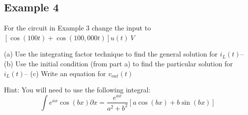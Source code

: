 \documentclass{handout}
\theoremstyle{definition}
\begin{document}
\newpage
\clearpage
\pagebreak

\subsection{Example 4}
For the circuit in Example 3 change the input to $\left[\cos(100t) + \cos(100,000t)\right]u(t)\ V$

(a) Use the integrating factor technique to find the general solution for $i_L(t)$--
(b) Use the initial condition (from part a) to find the particular solution for  $i_L(t)$--
(c) Write an equation for $v_{out}(t)$

Hint: You will need to use the following integral:
\[
\int e^{ax}\cos(bx) \partial x = \frac{e^{ax}}{a^2+b^2}\left[a\cos(bx) +b\sin(bx)  \right]
\]


\newpage
\clearpage
\pagebreak
\end{document}
